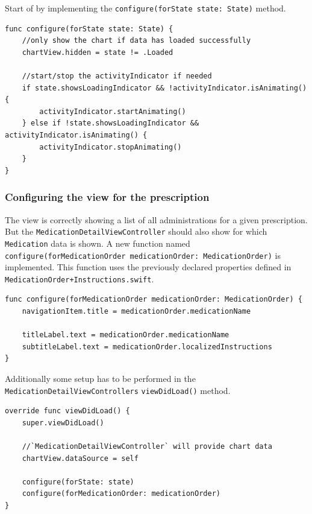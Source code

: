 \documentclass{article}
\begin{document}
Start of by implementing the \texttt{configure(forState\ state:\ State)}
method.

\begin{verbatim}
func configure(forState state: State) {
    //only show the chart if data has loaded successfully
    chartView.hidden = state != .Loaded

    //start/stop the activityIndicator if needed
    if state.showsLoadingIndicator && !activityIndicator.isAnimating() {
        activityIndicator.startAnimating()
    } else if !state.showsLoadingIndicator && activityIndicator.isAnimating() {
        activityIndicator.stopAnimating()
    }
}
\end{verbatim}

\subsubsection{Configuring the view for the prescription}\label{configuring-the-view-for-the-prescription}

The view is correctly showing a list of all administrations for a given
prescription. But the \texttt{MedicationDetailViewController} should
also show for which \texttt{Medication} data is shown. A new function
named
\texttt{configure(forMedicationOrder\ medicationOrder:\ MedicationOrder)}
is implemented. This function uses the previously declared properties
defined in \texttt{MedicationOrder+Instructions.swift}.

\begin{verbatim}
func configure(forMedicationOrder medicationOrder: MedicationOrder) {
    navigationItem.title = medicationOrder.medicationName

    titleLabel.text = medicationOrder.medicationName
    subtitleLabel.text = medicationOrder.localizedInstructions
}
\end{verbatim}

Additionally some setup has to be performed in the
\texttt{MedicationDetailViewControllers} \texttt{viewDidLoad()} method.

\begin{verbatim}
override func viewDidLoad() {
    super.viewDidLoad()

    //`MedicationDetailViewController` will provide chart data
    chartView.dataSource = self

    configure(forState: state)
    configure(forMedicationOrder: medicationOrder)
}
\end{verbatim}
\end{document}

